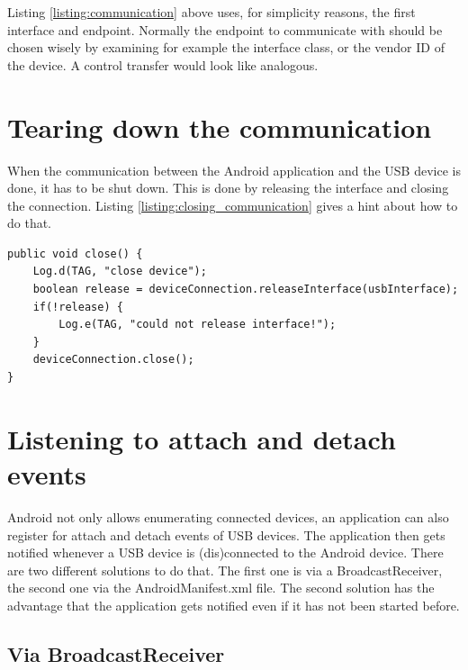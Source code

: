 Listing \ref{listing:communication} above uses, for simplicity reasons, the first interface and endpoint. Normally the endpoint to communicate with should be chosen wisely by examining for example the interface class, or the vendor ID of the device. A control transfer would look like analogous.

\section{Tearing down the communication}

When the communication between the Android application and the USB device is done, it has to be shut down. This is done by releasing the interface and closing the connection. Listing \ref{listing:closing_communication} gives a hint about how to do that.

\begin{lstlisting}[caption=Closing communication, label=listing:closing_communication]
public void close() {
	Log.d(TAG, "close device");
	boolean release = deviceConnection.releaseInterface(usbInterface);
	if(!release) {
		Log.e(TAG, "could not release interface!");
	}
	deviceConnection.close();
}
\end{lstlisting}

\section{Listening to attach and detach events}

Android not only allows enumerating connected devices, an application can also register for attach and detach events of USB devices. The application then gets notified whenever a USB device is (dis)connected to the Android device. There are two different solutions to do that. The first one is via a BroadcastReceiver, the second one via the AndroidManifest.xml file. The second solution has the advantage that the application gets notified even if it has not been started before.

\subsection{Via BroadcastReceiver}

